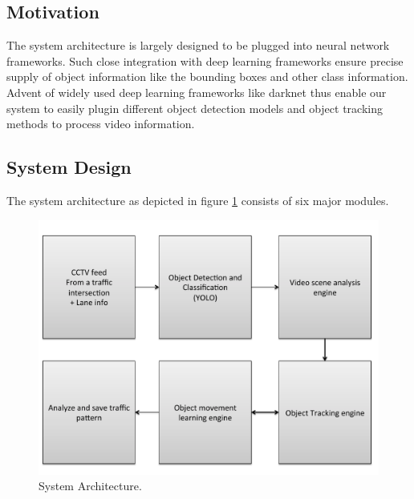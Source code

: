 \documentclass[conference]{IEEEtran}
\newcommand{\figwidthb}{0.80\linewidth}
\begin{document}
\subsection{Motivation}
The system architecture is largely designed to be plugged into neural network frameworks. 
Such close integration with deep learning frameworks ensure precise supply of object information like the bounding boxes and other class information.
Advent of widely used deep learning frameworks like darknet thus enable our system to easily plugin different object detection models and object tracking methods to process video information.
\subsection{System Design}
The system architecture as depicted in figure \ref{fig.sysarch} consists of six major modules.
\begin{figure}[!htb]%
\centering
\includegraphics[scale=0.25]{fig/SystemArchitecture.pdf} %
\caption{System Architecture.} \label{fig.sysarch}
\end{figure}
\end{document}
